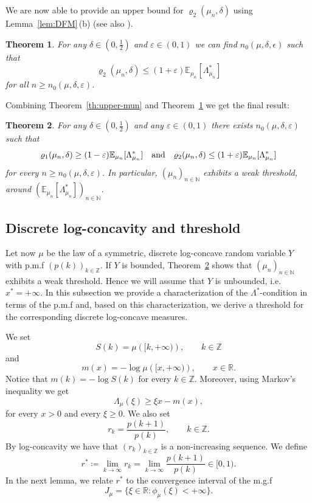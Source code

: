 \documentclass[11pt,a4paper]{article} %
\newtheorem{theorem}{Theorem}[section]
\theoremstyle{definition}
\theoremstyle{remark}
\newcommand{\1}{\mathds{1}}
\newcommand{\ls}{\le}
\newcommand{\gr}{\ge}
\begin{document}
We are now able to provide an upper bound for $\varrho_2(\mu_n,\delta)$ using Lemma~\ref{lem:DFM}\,(b) (see also \cite[Theorem 3.9]{Paf}).

\begin{theorem}\label{th:lower-mun}
For any $\delta\in \left(0,\tfrac{1}{2}\right)$ and $\varepsilon\in (0,1)$ we can find $n_0(\mu,\delta,\epsilon )$ such that
$$\varrho_2(\mu_n ,\delta )\ls \left(1+\varepsilon \right)\mathbb{E}_{\mu_n}[\Lambda_{\mu_n}^{*}]$$
for all $n\gr n_0(\mu,\delta,\varepsilon )$.
\end{theorem}

Combining Theorem~\ref{th:upper-mun} and Theorem~\ref{th:lower-mun} we get the final result:


\begin{theorem}\label{th:final}For any $\delta\in \left(0,\tfrac{1}{2}\right)$
and any $\varepsilon\in (0,1)$ there exists $n_0(\mu,\delta,\varepsilon)$ such that
$$\varrho_1(\mu_n,\delta)\gr (1-\varepsilon){\mathbb E}_{\mu_n}[\Lambda_{\mu_n}^{\ast}]\quad\hbox{and}\quad
\varrho_2(\mu_n,\delta)\ls (1+\varepsilon){\mathbb E}_{\mu_n}[\Lambda_{\mu_n}^{\ast}]$$
for every $n\gr n_0(\mu,\delta,\varepsilon)$. In particular, $(\mu_n)_{n \in \mathbb{N}}$ exhibits a weak threshold, around $({\mathbb E}_{\mu_n}[\Lambda_{\mu_n}^{\ast}])_{n \in \mathbb{N}}$.
\end{theorem}


\subsection{Discrete log-concavity and threshold}

Let now $\mu$  be the law of a symmetric, discrete log-concave random variable $Y$ with p.m.f $(p(k))_{k \in \mathbb{Z}}$. If $Y$ is bounded, Theorem~\ref{th:final} shows that $(\mu_n)_{n \in \mathbb{N}}$ exhibits a weak threshold. Hence we will assume that $Y$ is unbounded, i.e. $x^\ast=+\infty$. In this subsection we provide a characterization of the $\Lambda^\ast$-condition in terms of the p.m.f and, based on this characterization, we derive a threshold for the corresponding discrete log-concave measures.


We set $$S(k)=\mu\left([k,+\infty)\right), \qquad k \in \mathbb{Z}$$ and $$m(x)=-\log \mu\left([x,+\infty)\right), \qquad x \in \mathbb{R}.$$ Notice that $m(k)=-\log S(k)$ for every $k \in \mathbb{Z}$. Moreover, using Markov's inequality we get \begin{equation}\label{eq:m-Lambda}
\Lambda_\mu (\xi) \geq \xi x-m(x),    
\end{equation} for every $x>0$ and every $\xi \geq 0$.
We also set $$r_k= \frac{p(k+1)}{p(k)}, \qquad k \in \mathbb{Z}.$$ By log-concavity we have that $(r_k)_{k \in \mathbb{Z}}$ is a non-increasing sequence. We define $$r^\ast \coloneq\lim_{k \to \infty}r_k=\lim_{k \to \infty} \frac{p(k+1)}{p(k)} \in [0,1).$$ In the next lemma, we relate $r^\ast$ to the convergence interval of the m.g.f $$J_\mu=\{\xi \in \mathbb{R}:\phi_\mu(\xi) <+\infty\}.$$
\end{document}
